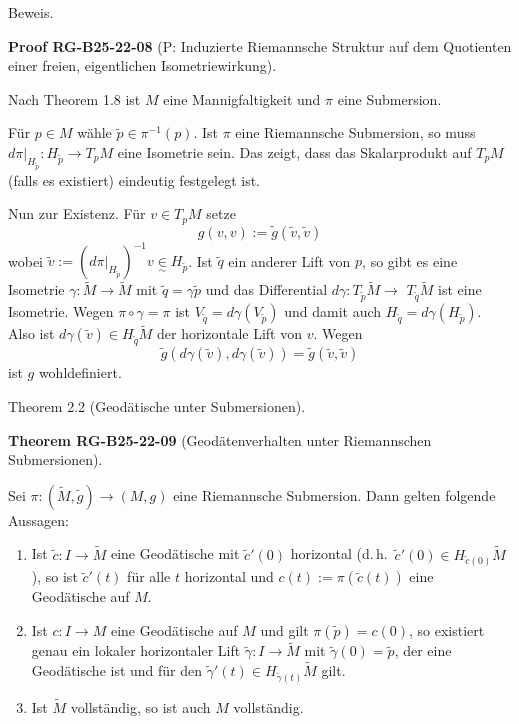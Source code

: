 \documentclass[10pt, letterpaper]{article}
\newcommand{\CustomHeading}[3]{%
  \par\medskip\noindent%
  \textbf{#1 #2} \textnormal{(#3)}.\enskip%
}
\newenvironment{THEO}[2]{\begin{unitbox}\CustomHeading{Theorem}{#1}{#2}}{\end{unitbox}}
\newenvironment{PROOF}[2]{\begin{unitbox}\CustomHeading{Proof}{#1}{#2}}{\end{unitbox}}
\begin{document}
Beweis. 

\begin{PROOF}{RG-B25-22-08}{P: Induzierte Riemannsche Struktur auf dem Quotienten einer freien, eigentlichen Isometriewirkung}
Nach Theorem 1.8 ist $M$ eine Mannigfaltigkeit und $\pi$ eine Submersion.

Für $p \in M$ wähle $\tilde{p} \in \pi^{-1}(p)$. Ist $\pi$ eine Riemannsche Submersion, so muss $\left.d \pi\right|_{H_{\tilde{p}}}: H_{\tilde{p}} \rightarrow T_{p} M$ eine Isometrie sein. Das zeigt, dass das Skalarprodukt auf $T_{p} M$ (falls es existiert) eindeutig festgelegt ist.

Nun zur Existenz. Für $v \in T_{p} M$ setze
$$
g(v, v):=\tilde{g}(\tilde{v}, \tilde{v})
$$
wobei $\tilde{v}:=\left(\left.d \pi\right|_{H_{\tilde{p}}}\right)^{-1} v \underset{\sim}{\in} H_{\tilde{p}}$. Ist $\tilde{q}$ ein anderer Lift von $p$, so gibt es eine Isometrie $\gamma: \tilde{M} \rightarrow \tilde{M}$ mit $\tilde{q}=\gamma \tilde{p}$ und das Differential $d \gamma: T_{\tilde{p}} \tilde{M} \rightarrow$ $T_{\tilde{q}} \tilde{M}$ ist eine Isometrie. Wegen $\pi \circ \gamma=\pi$ ist $V_{\tilde{q}}=d \gamma\left(V_{\tilde{p}}\right)$ und damit auch $H_{\tilde{q}}=d \gamma\left(H_{\tilde{p}}\right)$. Also ist $d \gamma(\tilde{v}) \in H_{\tilde{q}} \tilde{M}$ der horizontale Lift von $v$. Wegen
$$
\tilde{g}(d \gamma(\tilde{v}), d \gamma(\tilde{v}))=\tilde{g}(\tilde{v}, \tilde{v})
$$
ist $g$ wohldefiniert.
\end{PROOF}


Theorem 2.2 (Geodätische unter Submersionen). 


\begin{THEO}{RG-B25-22-09}{Geodätenverhalten unter Riemannschen Submersionen}
Sei $\pi : (\tilde{M}, \tilde{g}) \rightarrow (M, g)$ eine Riemannsche Submersion. Dann gelten folgende Aussagen:

\begin{enumerate}
  \item Ist $\tilde{c} : I \rightarrow \tilde{M}$ eine Geodätische mit $\tilde{c}'(0)$ horizontal (d.\,h.\ $\tilde{c}'(0) \in H_{\tilde{c}(0)} \tilde{M}$), so ist $\tilde{c}'(t)$ für alle $t$ horizontal und $c(t) := \pi(\tilde{c}(t))$ eine Geodätische auf $M$.

  \item Ist $c : I \rightarrow M$ eine Geodätische auf $M$ und gilt $\pi(\tilde{p}) = c(0)$, so existiert genau ein lokaler horizontaler Lift $\tilde{\gamma} : I \rightarrow \tilde{M}$ mit $\tilde{\gamma}(0) = \tilde{p}$, der eine Geodätische ist und für den $\tilde{\gamma}'(t) \in H_{\tilde{\gamma}(t)} \tilde{M}$ gilt.

  \item Ist $\tilde{M}$ vollständig, so ist auch $M$ vollständig.
\end{enumerate}
\end{THEO}
\end{document}
